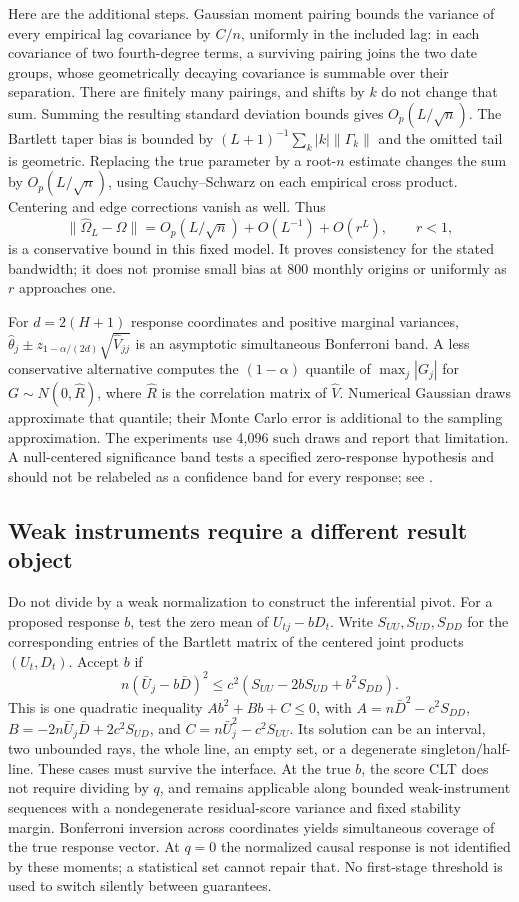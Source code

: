 Here are the additional steps. Gaussian moment pairing bounds the variance
of every empirical lag covariance by $C/n$, uniformly in the included
lag: in each covariance of two fourth-degree terms, a surviving pairing
joins the two date groups, whose geometrically decaying covariance is
summable over their separation. There are finitely many pairings, and
shifts by $k$ do not change that sum. Summing the resulting standard
deviation bounds gives $O_p(L/\sqrt n)$. The Bartlett taper bias is
bounded by $(L+1)^{-1}\sum_k |k|\|\Gamma_k\|$ and the omitted tail
is geometric. Replacing the true parameter by a root-$n$ estimate changes
the sum by $O_p(L/\sqrt n)$, using Cauchy--Schwarz on each empirical
cross product. Centering and edge corrections vanish as well. Thus
\[
 \|\widehat\Omega_L-\Omega\|
 =O_p(L/\sqrt n)+O(L^{-1})+O(r^L),\qquad r<1,
\]
is a conservative bound in this fixed model. It proves consistency for
the stated bandwidth; it does not promise small bias at 800 monthly origins
or uniformly as $r$ approaches one.

For $d=2(H+1)$ response coordinates and positive marginal variances,
$\widehat\theta_j\pm z_{1-\alpha/(2d)}\sqrt{\widehat V_{jj}}$
is an asymptotic simultaneous Bonferroni band. A less conservative
alternative computes the $(1-\alpha)$ quantile of
$\max_j|G_j|$ for $G\sim N(0,\widehat R)$, where $\widehat R$ is
the correlation matrix of $\widehat V$. Numerical Gaussian draws
approximate that quantile; their Monte Carlo error is additional to the
sampling approximation. The experiments use 4,096 such draws and report
that limitation. A null-centered significance band tests a specified
zero-response hypothesis and should not be relabeled as a confidence
band for every response; see \citet[equations (5)--(8)]{inoue2023}.

\subsection{Weak instruments require a different result object}
Do not divide by a weak normalization to construct the inferential pivot.
For a proposed response $b$, test the zero mean of $U_{tj}-bD_t$.
Write $S_{UU},S_{UD},S_{DD}$ for the corresponding entries of the
Bartlett matrix of the centered joint products $(U_t,D_t)$. Accept $b$ if
\begin{equation}
 n(\bar U_j-b\bar D)^2
 \le c^2(S_{UU}-2bS_{UD}+b^2S_{DD}).
 \label{s4:weak-inversion}
\end{equation}
This is one quadratic inequality $A b^2+B b+C\le0$, with
$A=n\bar D^2-c^2S_{DD}$,
$B=-2n\bar U_j\bar D+2c^2S_{UD}$, and
$C=n\bar U_j^2-c^2S_{UU}$.
Its solution can be an interval, two unbounded rays, the whole line,
an empty set, or a degenerate singleton/half-line. These cases must survive
the interface. At the true $b$, the score CLT does not require dividing
by $q$, and remains applicable along bounded weak-instrument sequences
with a nondegenerate residual-score variance and fixed stability margin.
Bonferroni inversion across coordinates yields simultaneous coverage of
the true response vector. At $q=0$ the normalized causal response is
not identified by these moments; a statistical set cannot repair that.
No first-stage threshold is used to switch silently between guarantees.

